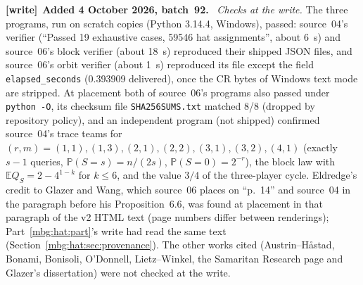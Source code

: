 \documentclass[11pt,letterpaper]{article}
\theoremstyle{definition}
\newcommand{\E}{\mathbb E}
\newcommand{\Prb}{\mathbb P}
\newenvironment{writenote}[1][]{\par\smallskip\begingroup\small
 \noindent\textbf{[write]}\if\relax\detokenize{#1}\relax\else~\textbf{#1.}\fi\ }%
 {\par\endgroup\smallskip}
\begin{document}
\begin{writenote}[Added 4 October 2026, batch~92]
\emph{Checks at the write.} The three programs, run on scratch copies (Python 3.14.4, Windows), passed: source~04's verifier (``Passed 19 exhaustive cases, 59546 hat assignments'', about 6~s) and source~06's block verifier (about 18~s) reproduced their shipped JSON files, and source~06's orbit verifier (about 1~s) reproduced its file except the field \texttt{elapsed\_seconds} (0.393909 delivered), once the CR bytes of Windows text mode are stripped. At placement both of source~06's programs also passed under \texttt{python -O}, its checksum file \texttt{SHA256SUMS.txt} matched 8/8 (dropped by repository policy), and an independent program (not shipped) confirmed source~04's trace teams for $(r,m)=(1,1),(1,3),(2,1),(2,2),(3,1),(3,2),(4,1)$ (exactly $s-1$ queries, $\Prb(S=s)=n/(2s)$, $\Prb(S=0)=2^{-r}$), the block law with $\E Q_S=2-4^{1-k}$ for $k\le6$, and the value $3/4$ of the three-player cycle. Eldredge's credit to Glazer and Wang, which source~06 places on ``p.~14'' and source~04 in the paragraph before his Proposition~6.6, was found at placement in that paragraph of the v2 HTML text (page numbers differ between renderings); Part~\ref{mbg:hat:part}'s write had read the same text (Section~\ref{mbg:hat:sec:provenance}). The other works cited (Austrin--H\aa stad, Bonami, Bonisoli, O'Donnell, Lietz--Winkel, the Samaritan Research page and Glazer's dissertation) were not checked at the write.


\end{writenote}
\end{document}
